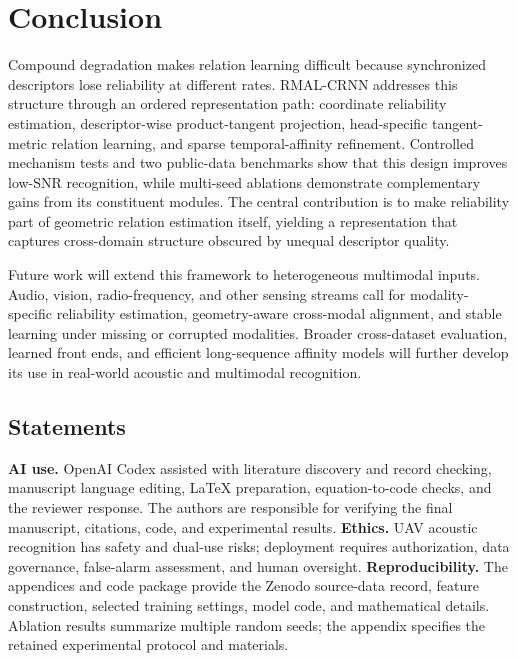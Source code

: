 \documentclass{article}
\begin{document}
\section{Conclusion}
Compound degradation makes relation learning difficult because synchronized descriptors lose reliability at different rates. RMAL-CRNN addresses this structure through an ordered representation path: coordinate reliability estimation, descriptor-wise product-tangent projection, head-specific tangent-metric relation learning, and sparse temporal-affinity refinement. Controlled mechanism tests and two public-data benchmarks show that this design improves low-SNR recognition, while multi-seed ablations demonstrate complementary gains from its constituent modules. The central contribution is to make reliability part of geometric relation estimation itself, yielding a representation that captures cross-domain structure obscured by unequal descriptor quality.

Future work will extend this framework to heterogeneous multimodal inputs. Audio, vision, radio-frequency, and other sensing streams call for modality-specific reliability estimation, geometry-aware cross-modal alignment, and stable learning under missing or corrupted modalities. Broader cross-dataset evaluation, learned front ends, and efficient long-sequence affinity models will further develop its use in real-world acoustic and multimodal recognition.

\subsection*{Statements}
\textbf{AI use.} OpenAI Codex assisted with literature discovery and record checking, manuscript language editing, LaTeX preparation, equation-to-code checks, and the reviewer response. The authors are responsible for verifying the final manuscript, citations, code, and experimental results. \textbf{Ethics.} UAV acoustic recognition has safety and dual-use risks; deployment requires authorization, data governance, false-alarm assessment, and human oversight. \textbf{Reproducibility.} The appendices and code package provide the Zenodo source-data record, feature construction, selected training settings, model code, and mathematical details. Ablation results summarize multiple random seeds; the appendix specifies the retained experimental protocol and materials.




\appendix


\end{document}
